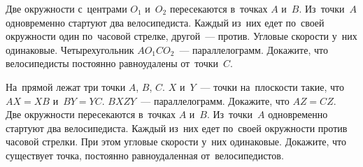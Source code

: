 \begin{problems}
\item
Две окружности с~центрами $O_1$ и~$O_2$ пересекаются в~точках $A$ и~$B$.
Из~точки~$A$ одновременно стартуют два велосипедиста.
Каждый из~них едет по~своей окружности один по~часовой стрелке,
другой~--- против.
Угловые скорости у~них одинаковые.
Четырехугольник $A O_1 C O_2$~--- параллелограмм.
Докажите, что велосипедисты постоянно равноудалены от~точки~$C$.

\item
\subproblem
На~прямой лежат три точки $A$, $B$, $C$.
$X$ и~$Y$~--- точки на~плоскости такие, что $AX = XB$ и~$BY = YC$.
$BXZY$~--- параллелограмм.
Докажите, что $AZ = CZ$.
\\
\subproblem
Две окружности пересекаются в~точках $A$ и~$B$.
Из~точки~$A$ одновременно стартуют два велосипедиста.
Каждый из~них едет по~своей окружности против часовой стрелки.
При этом угловые скорости у~них одинаковые.
Докажите, что существует точка, постоянно равноудаленная от~велосипедистов.

\end{problems}


